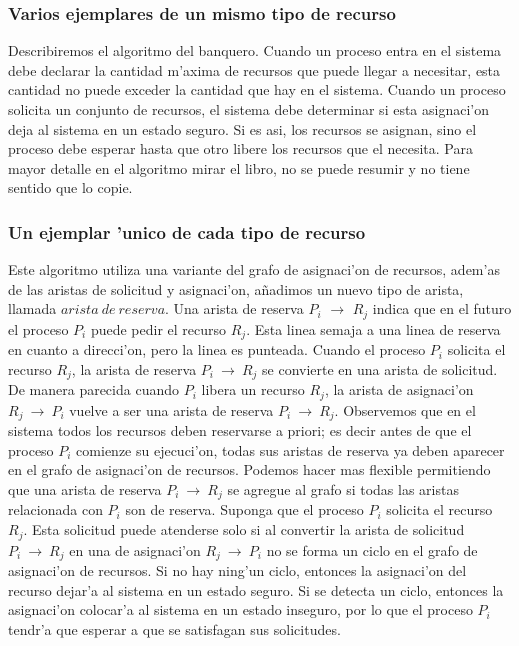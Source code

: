 \documentclass[a4paper,10pt]{article}
\begin{document}
\subsubsection{Varios ejemplares de un mismo tipo de recurso}
Describiremos el algoritmo del banquero.
Cuando un proceso entra en el sistema debe declarar la cantidad m'axima de recursos que puede llegar a necesitar, esta cantidad no puede exceder la cantidad que hay en el sistema. Cuando un proceso solicita un conjunto de recursos, el sistema debe determinar si esta asignaci'on deja al sistema en un estado seguro. Si es asi, los recursos se asignan, sino el proceso debe esperar hasta que otro libere los recursos que el necesita. Para mayor detalle en el algoritmo mirar el libro, no se puede resumir y no tiene sentido que lo copie.

\subsubsection{Un ejemplar 'unico de cada tipo de recurso}
Este algoritmo utiliza una variante del grafo de asignaci'on de recursos, adem'as de las aristas de solicitud y asignaci'on, añadimos un nuevo tipo de arista, llamada $arista\ de\ reserva$. Una arista de reserva $P_{i}$ $\rightarrow$ $R_{j}$ indica que en el futuro el proceso $P_{i}$ puede pedir el recurso $R_{j}$. Esta linea semaja a una linea de reserva en cuanto a direcci'on, pero la linea es punteada. Cuando el proceso $P_{i}$ solicita el recurso $R_{j}$, la arista de reserva $P_{i}\ \rightarrow\ R_{j}$ se convierte en una arista de solicitud. De manera parecida cuando $P_{i}$ libera un recurso $R_{j}$, la arista de asignaci'on $R_{j}\ \rightarrow\ P_{i}$ vuelve a ser una arista de reserva $P_{i}\ \rightarrow\ R_{j}$. Observemos que en el sistema todos los recursos deben reservarse a priori; es decir antes de que el proceso $P_{i}$ comienze su ejecuci'on, todas sus aristas de reserva ya deben aparecer en el grafo de asignaci'on de recursos. Podemos hacer mas flexible permitiendo que una arista de reserva $P_{i}\ \rightarrow\ R_{j}$ se agregue al grafo si todas las aristas relacionada con $P_{i}$ son de reserva.
Suponga que el proceso $P_{i}$ solicita el recurso $R_{j}$. Esta solicitud puede atenderse solo si al convertir la arista de solicitud $P_{i}\ \rightarrow\ R_{j}$ en una de asignaci'on $R_{j}\ \rightarrow\ P_{i}$ no se forma un ciclo en el grafo de asignaci'on de recursos.
Si no hay ning'un ciclo, entonces la asignaci'on del recurso dejar'a al sistema en un estado seguro. Si se detecta un ciclo, entonces la asignaci'on colocar'a al sistema en un estado inseguro, por lo que el proceso $P_{i}$ tendr'a que esperar a que se satisfagan sus solicitudes.
\end{document}
